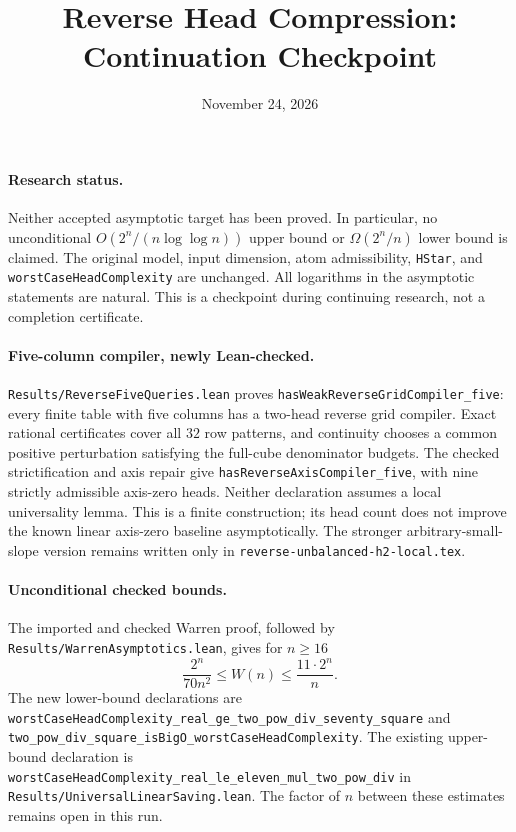 \documentclass[11pt]{article}
\title{Reverse Head Compression: Continuation Checkpoint}
\author{}
\date{November 24, 2026}
\begin{document}
\maketitle

\paragraph{Research status.}
Neither accepted asymptotic target has been proved. In particular, no
unconditional $O(2^n/(n\log\log n))$ upper bound or
$\Omega(2^n/n)$ lower bound is claimed. The original model, input
dimension, atom admissibility, \texttt{HStar}, and
\texttt{worstCaseHeadComplexity} are unchanged. All logarithms in the
asymptotic statements are natural. This is a checkpoint during continuing
research, not a completion certificate.

\paragraph{Five-column compiler, newly Lean-checked.}
\texttt{Results/ReverseFiveQueries.lean} proves
\texttt{hasWeakReverseGridCompiler\_five}: every finite table with five
columns has a two-head reverse grid compiler. Exact rational certificates
cover all $32$ row patterns, and continuity chooses a common positive
perturbation satisfying the full-cube denominator budgets. The checked
strictification and axis repair give
\texttt{hasReverseAxisCompiler\_five}, with nine strictly admissible
axis-zero heads. Neither declaration assumes a local universality lemma.
This is a finite construction; its head count does not improve the known
linear axis-zero baseline asymptotically. The stronger arbitrary-small-slope
version remains written only in \texttt{reverse-unbalanced-h2-local.tex}.

\paragraph{Unconditional checked bounds.}
The imported and checked Warren proof, followed by
\texttt{Results/WarrenAsymptotics.lean}, gives for $n\geq16$
\[
 \frac{2^n}{70n^2}\leq W(n)\leq\frac{11\cdot2^n}{n}.
\]
The new lower-bound declarations are
\texttt{worstCaseHeadComplexity\_real\_ge\_two\_pow\_div\_seventy\_square}
and \texttt{two\_pow\_div\_square\_isBigO\_worstCaseHeadComplexity}.
The existing upper-bound declaration is
\texttt{worstCaseHeadComplexity\_real\_le\_eleven\_mul\_two\_pow\_div}
in \texttt{Results/UniversalLinearSaving.lean}. The factor of $n$
between these estimates remains open in this run.
\end{document}
